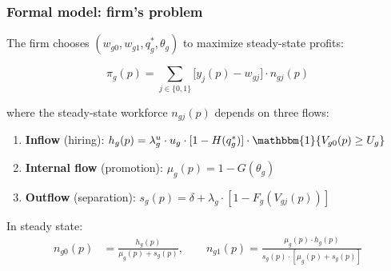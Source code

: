 \documentclass[aspectratio=169, 11pt]{beamer}
\begin{document}
\begin{frame}
\frametitle{Formal model: firm's problem}

\small
The firm chooses $(w_{g0}, w_{g1}, q_g^*, \theta_g)$ to maximize steady-state profits:

\begin{equation*}
    \pi_g(p) = \sum_{j \in \{0,1\}} \bigl[y_{j}(p) - w_{gj}\bigr] \cdot n_{gj}(p)
\end{equation*}

where the steady-state workforce $n_{gj}(p)$ depends on three flows:

\vspace{0.2cm}
\begin{enumerate}
    \item \textbf{Inflow} (hiring): $h_g(p) = \lambda_g^u \cdot u_g \cdot [1 - H(q_g^*)] \cdot \mathbbm{1}\{V_{g0}(p) \geq U_g\}$
    \medskip
    \item \textbf{Internal flow} (promotion): $\mu_g(p) = 1 - G(\theta_g)$
    \medskip
    \item \textbf{Outflow} (separation): $s_g(p) = \delta + \lambda_g \cdot [1 - F_g(V_{gj}(p))]$
\end{enumerate}

\vspace{0.2cm}
In steady state:
\begin{align*}
    n_{g0}(p) &= \frac{h_g(p)}{\mu_g(p) + s_g(p)}, \qquad
    n_{g1}(p) = \frac{\mu_g(p) \cdot h_g(p)}{s_g(p) \cdot [\mu_g(p) + s_g(p)]}
\end{align*}

\hfill\hyperlink{retentionslide}{}

\end{frame}
\end{document}
